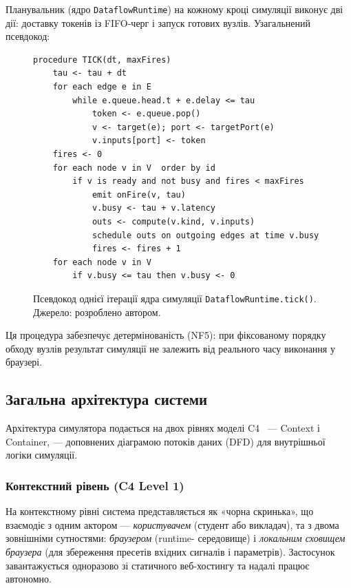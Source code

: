 Планувальник (ядро \texttt{DataflowRuntime}) на кожному кроці
симуляції виконує дві дії: доставку токенів із FIFO-черг і запуск
готових вузлів. Узагальнений псевдокод:

\begin{figure}[H]
\begin{verbatim}
procedure TICK(dt, maxFires)
    tau <- tau + dt
    for each edge e in E
        while e.queue.head.t + e.delay <= tau
            token <- e.queue.pop()
            v <- target(e); port <- targetPort(e)
            v.inputs[port] <- token
    fires <- 0
    for each node v in V  order by id
        if v is ready and not busy and fires < maxFires
            emit onFire(v, tau)
            v.busy <- tau + v.latency
            outs <- compute(v.kind, v.inputs)
            schedule outs on outgoing edges at time v.busy
            fires <- fires + 1
    for each node v in V
        if v.busy <= tau then v.busy <- 0
\end{verbatim}
\caption{Псевдокод однієї ітерації ядра симуляції \texttt{DataflowRuntime.tick()}.
         Джерело: розроблено автором.}
\label{fig:tick_pseudo}
\end{figure}

Ця процедура забезпечує детермінованість (NF5): при фіксованому порядку
обходу вузлів результат симуляції не залежить від реального часу
виконання у браузері.


\subsection{Загальна архітектура системи}

Архітектура симулятора подається на двох рівнях моделі C4~\cite{c4model}
--- Context і Container, --- доповнених діаграмою потоків даних (DFD)
для внутрішньої логіки симуляції.

\subsubsection*{Контекстний рівень (C4 Level 1)}

На контекстному рівні система представляється як «чорна скринька»,
що взаємодіє з одним актором --- \emph{користувачем} (студент або
викладач), та з двома зовнішніми сутностями: \emph{браузером} (runtime-
середовище) і \emph{локальним сховищем браузера} (для збереження
пресетів вхідних сигналів і параметрів). Застосунок завантажується
одноразово зі статичного веб-хостингу та надалі працює автономно.

